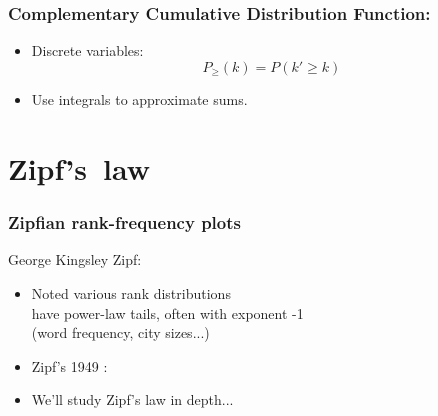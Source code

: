 \begin{frame}
  \frametitle{\small Complementary Cumulative Distribution Function:}

  \begin{block}{}
    \begin{itemize}
    \item<1->
      Discrete variables:
      $$ P_\ge(k) = P(k' \ge k) $$
    \item<4->
      Use integrals to approximate sums.
    \end{itemize}
  \end{block}

\end{frame}

\section{Zipf's\ law}

\begin{frame}
  \frametitle{Zipfian rank-frequency plots}

  \begin{block}{George Kingsley Zipf:}
    \begin{itemize}
    \item<1->
      Noted various rank distributions\\ 
      have power-law tails, often with exponent -1\\
      (word frequency, city sizes...)
    \item<2->
      Zipf's 1949 :\\
    \end{itemize}
    \begin{overprint}
    \end{overprint}
    \begin{itemize}
    \item<3-> We'll study Zipf's law in depth...
    \end{itemize}
  \end{block}


\end{frame}

